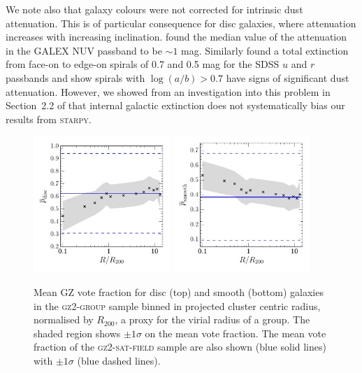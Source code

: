 \documentclass[useAMS,usenatbib]{mn2e}
\def\starpy ~{\textsc{starpy}}
\begin{document}
We note also that galaxy colours were not corrected for intrinsic dust attenuation. This is of particular consequence for disc galaxies, where attenuation increases with increasing inclination. \cite{Buat05} found the median value of the attenuation in the GALEX NUV passband to be $\sim 1$ mag. Similarly \cite{masters10c} found a total extinction from face-on to edge-on spirals of 0.7 and 0.5 mag for the SDSS $u$ and $r$ passbands and show spirals with $\log(a/b) > 0.7$ have signs of significant dust attenuation. However, we showed from an investigation into this problem in Section~2.2 of \citet{smethurst16} that internal galactic extinction does not systematically bias our results from \starpy~. 

\begin{figure}
\includegraphics[width=0.46\textwidth]{p_disc_trend_with_log_radius_field_compare.pdf}
\includegraphics[width=0.46\textwidth]{p_smooth_trend_with_log_radius_field_compare.pdf}
\caption{Mean GZ vote fraction for disc (top) and smooth (bottom) galaxies in the \textsc{gz2-group} sample binned in projected cluster centric radius, normalised by $R_{200}$, a proxy for the virial radius of a group. The shaded region shows $\pm1\sigma$ on the mean vote fraction. The mean vote fraction of the \textsc{gz2-sat-field} sample are also shown (blue solid lines) with $\pm1\sigma$ (blue dashed lines).}
\label{fig:morphradius}
\end{figure}
\end{document}
